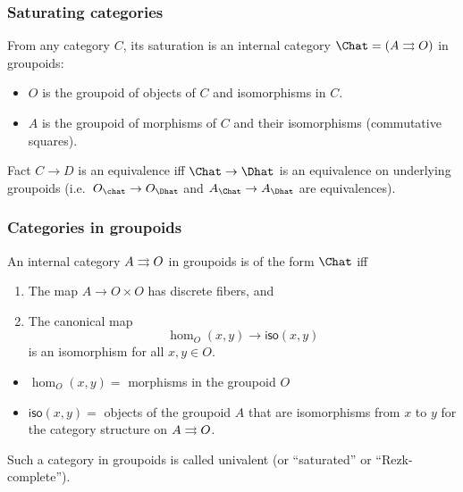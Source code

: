 \documentclass{beamer}
\begin{document}
\begin{frame}
  \frametitle{Saturating categories}
  From any category $C$, its \alert{saturation} is an internal category $\Chat = (A\toto O)$ in groupoids:
  \begin{itemize}
  \item $O$ is the groupoid of objects of $C$ and isomorphisms in $C$.
  \item $A$ is the groupoid of morphisms of $C$ and their isomorphisms (commutative squares).
  \end{itemize}
  \pause
  \begin{block}{Fact}
    $C\to D$ is an equivalence iff $\Chat \to \Dhat$ is an \alert{equivalence on underlying groupoids} (i.e.\ $O_{\chat} \to O_{\Dhat}$ and $A_{\Chat} \to A_{\Dhat}$ are equivalences).
  \end{block}
\end{frame}

\begin{frame}
  \frametitle{Categories in groupoids}
  \begin{theorem}
    An internal category $A\rightrightarrows O$ in groupoids is of the form $\Chat$ iff
    \begin{enumerate}
    \item The map $A\to O\times O$ has discrete fibers, and
    \item The canonical map
    \[ \hom_O(x,y) \to \mathsf{iso}(x,y) \]
    is an isomorphism for all $x,y\in O$.
    \end{enumerate}
  \end{theorem}
  \begin{itemize}
  \item $\hom_O(x,y)=$ morphisms in the groupoid $O$
  \item $\mathsf{iso}(x,y)=$ objects of the groupoid $A$ that are isomorphisms from $x$ to $y$ for the category structure on $A\rightrightarrows O$.
  \end{itemize}
  Such a category in groupoids is called \alert{univalent} (or ``saturated'' or ``Rezk-complete'').
\end{frame}
\end{document}
